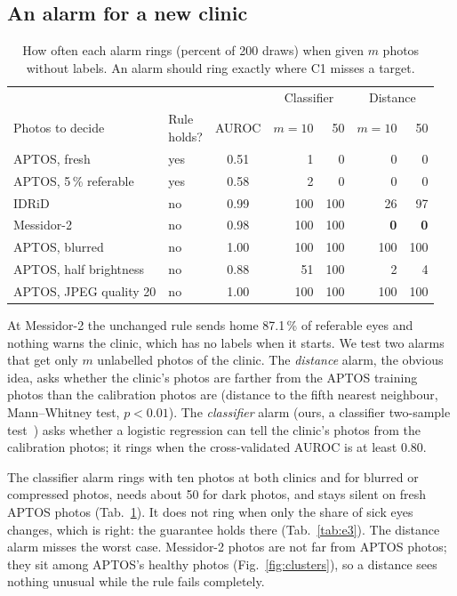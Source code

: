 \documentclass[10pt,twocolumn,letterpaper]{article}
\newcommand{\pct}{\,\%}
\begin{document}
\subsection{An alarm for a new clinic}
\begin{table}[t]\centering\small
\begin{adjustbox}{max width=\linewidth}\begin{tabular}{@{}llcrrrr@{}}\toprule
 & & & \multicolumn{2}{c}{Classifier} & \multicolumn{2}{c}{Distance}\\
Photos to decide & \shortstack{Rule\\holds?} & AUROC & $m{=}10$ & 50 & $m{=}10$ & 50\\\midrule
APTOS, fresh & yes & 0.51 & 1 & 0 & 0 & 0\\
APTOS, 5\pct{} referable & yes & 0.58 & 2 & 0 & 0 & 0\\
IDRiD & no & 0.99 & 100 & 100 & 26 & 97\\
Messidor-2 & no & 0.98 & 100 & 100 & \textbf{0} & \textbf{0}\\
APTOS, blurred & no & 1.00 & 100 & 100 & 100 & 100\\
APTOS, half brightness & no & 0.88 & 51 & 100 & 2 & 4\\
APTOS, JPEG quality 20 & no & 1.00 & 100 & 100 & 100 & 100\\\bottomrule
\end{tabular}\end{adjustbox}
\caption{How often each alarm rings (percent of 200 draws) when given $m$ photos without labels. An alarm should ring exactly where C1 misses a target.}\label{tab:alarm}
\end{table}
At Messidor-2 the unchanged rule sends home 87.1\pct{} of referable eyes and nothing warns the clinic, which has no labels when it starts. We test two alarms that get only $m$ unlabelled photos of the clinic. The \emph{distance} alarm, the obvious idea, asks whether the clinic's photos are farther from the APTOS training photos than the calibration photos are (distance to the fifth nearest neighbour, Mann--Whitney test, $p<0.01$). The \emph{classifier} alarm (ours, a classifier two-sample test~\cite{lopezpaz,rabanser}) asks whether a logistic regression can tell the clinic's photos from the calibration photos; it rings when the cross-validated AUROC is at least 0.80.

The classifier alarm rings with ten photos at both clinics and for blurred or compressed photos, needs about 50 for dark photos, and stays silent on fresh APTOS photos (Tab.~\ref{tab:alarm}). It does not ring when only the share of sick eyes changes, which is right: the guarantee holds there (Tab.~\ref{tab:e3}). The distance alarm misses the worst case. Messidor-2 photos are not far from APTOS photos; they sit among APTOS's healthy photos (Fig.~\ref{fig:clusters}), so a distance sees nothing unusual while the rule fails completely.
\end{document}

